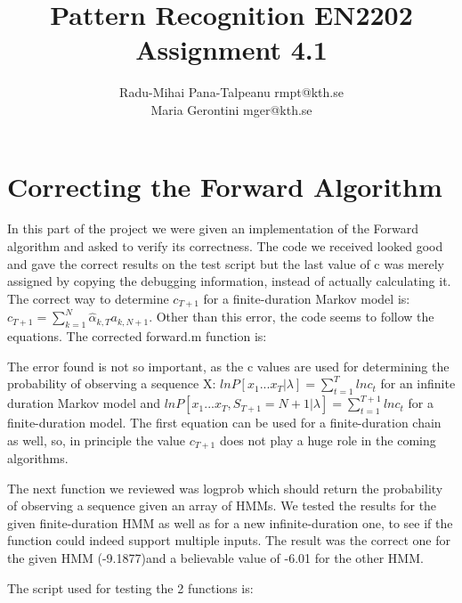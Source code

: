 \documentclass[a4paper, 10pt]{article}
\begin{document}
\title {Pattern Recognition EN2202 \\ Assignment 4.1}
\author{Radu-Mihai Pana-Talpeanu rmpt@kth.se \\Maria Gerontini mger@kth.se}
\maketitle
\section{Correcting the Forward Algorithm}
In this part of the project we were given an implementation of the Forward algorithm and asked to verify its correctness. The code we received looked good and gave the correct results on the test script but the last value of c was merely assigned by copying the debugging information, instead of actually calculating it. The correct way to determine $c_{T+1}$ for a finite-duration Markov model is: $c_{T+1}=\sum\limits_{k=1}^{N}\hat{\alpha}_{k,T}a_{k,N+1}$. Other than this error, the code seems to follow the equations. The corrected forward.m function is:


The error found is not so important, as the c values are used for determining the probability of observing a sequence X: $lnP[x_1...x_T|\lambda]=\sum\limits_{t=1}^{T}lnc_t$ for an infinite duration Markov model and $lnP[x_1...x_T,S_{T+1}=N+1|\lambda]=\sum\limits_{t=1}^{T+1}lnc_t$ for a finite-duration model. The first equation can be used for a finite-duration chain as well, so, in principle the value $c_{T+1}$ does not play a huge role in the coming algorithms.

The next function we reviewed was logprob which should return the probability of observing a sequence given an array of HMMs. We tested the results for the given finite-duration HMM as well as for a new infinite-duration one, to see if the function could indeed support multiple inputs. The result was the correct one for the given HMM (-9.1877)and a believable value of -6.01 for the other HMM.

The script used for testing the 2 functions is:


\end{document}
